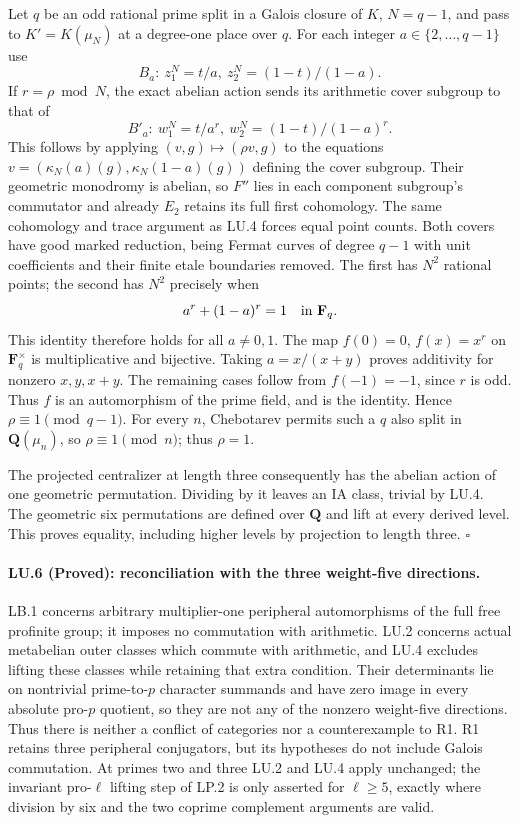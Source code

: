 Let $q$ be an odd rational prime split in a Galois closure of
$K$, $N=q-1$, and pass to $K'=K(\mu_N)$ at a degree-one place
over $q$. For each integer $a\in\{2,\ldots,q-1\}$ use
\[
 B_a:\ z_1^N=t/a,\ z_2^N=(1-t)/(1-a).
\]
If $r=\rho\bmod N$, the exact abelian action sends its
arithmetic cover subgroup to that of
\[
 B'_a:\ w_1^N=t/a^r,\ w_2^N=(1-t)/(1-a)^r.
\]
This follows by applying $(v,g)\mapsto(\rho v,g)$ to the
equations $v=(\kappa_N(a)(g),\kappa_N(1-a)(g))$ defining the
cover subgroup. Their geometric monodromy is abelian, so
$F''$ lies in each component subgroup's commutator and already
$E_2$ retains its full first cohomology. The same cohomology
and trace argument as LU.4 forces equal point counts. Both
covers have good marked reduction, being Fermat curves of
degree $q-1$ with unit coefficients and their finite etale
boundaries removed. The first has $N^2$ rational points;
the second has $N^2$ precisely when
\[
                       a^r+(1-a)^r=1\quad\hbox{in }\mathbf F_q.
\]
This identity therefore holds for all $a\ne0,1$. The map
$f(0)=0$, $f(x)=x^r$ on $\mathbf F_q^\times$ is multiplicative
and bijective. Taking $a=x/(x+y)$ proves additivity for nonzero
$x,y,x+y$. The remaining cases follow from $f(-1)=-1$, since
$r$ is odd. Thus $f$ is an automorphism of the prime field,
and is the identity. Hence $\rho\equiv1\pmod{q-1}$.
For every $n$, Chebotarev permits such a $q$ also split in
$\mathbf Q(\mu_n)$, so $\rho\equiv1\pmod n$; thus $\rho=1$.

The projected centralizer at length three consequently has
the abelian action of one geometric permutation. Dividing by
it leaves an IA class, trivial by LU.4. The geometric six
permutations are defined over $\mathbf Q$ and lift at every
derived level. This proves equality, including higher levels
by projection to length three. \hfill$\square$

\paragraph{LU.6 (Proved): reconciliation with the three weight-five directions.}
LB.1 concerns arbitrary multiplier-one peripheral automorphisms
of the full free profinite group; it imposes no commutation
with arithmetic. LU.2 concerns actual metabelian outer classes
which commute with arithmetic, and LU.4 excludes lifting these
classes while retaining that extra condition. Their determinants
lie on nontrivial prime-to-$p$ character summands and have zero
image in every absolute pro-$p$ quotient, so they are not any
of the nonzero weight-five directions. Thus there is neither
a conflict of categories nor a counterexample to R1. R1 retains
three peripheral conjugators, but its hypotheses do not include
Galois commutation. At primes two and three LU.2 and LU.4 apply
unchanged; the invariant pro-$\ell$ lifting step of LP.2 is
only asserted for $\ell\ge5$, exactly where division by six
and the two coprime complement arguments are valid.
